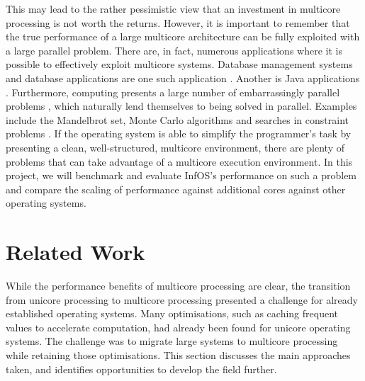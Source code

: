 \documentclass[bsc,frontabs,singlespacing,parskip,deptreport]{infthesis}     %
\begin{document}
This may lead to the rather pessimistic view that an investment in multicore processing is not worth the returns. However, it is important to remember that the true performance of a large multicore architecture can be fully exploited with a large parallel problem. There are, in fact, numerous applications where it is possible to effectively exploit multicore systems. Database management systems and database applications are one such application \cite{DBLP:journals/queue/McDougall05}. Another is Java applications \cite{DBLP:journals/usenix-login/McDougallL06}. Furthermore, computing presents a large number of embarrassingly parallel problems \cite{DBLP:books/daglib/0020056}, which naturally lend themselves to being solved in parallel. Examples include the Mandelbrot set, Monte Carlo algorithms \cite{DBLP:conf/uai/NeiswangerWX14} and searches in constraint problems \cite{DBLP:journals/jair/MalapertRR16}. If the operating system is able to simplify the programmer's task by presenting a clean, well-structured, multicore environment, there are plenty of problems that can take advantage of a multicore execution environment. In this project, we will benchmark and evaluate InfOS’s performance on such a problem and compare the scaling of performance against additional cores against other operating systems.




\section{Related Work} \label{related-work}
While the performance benefits of multicore processing are clear, the transition from unicore processing to multicore processing presented a challenge for already established operating systems. Many optimisations, such as caching frequent values to accelerate computation, had already been found for unicore operating systems. The challenge was to migrate large systems to multicore processing while retaining those optimisations. This section discusses the main approaches taken, and identifies opportunities to develop the field further.
\end{document}
